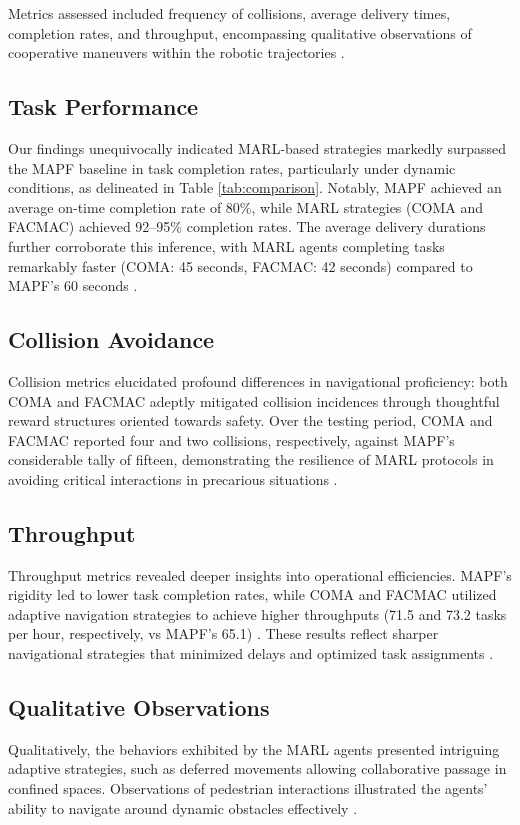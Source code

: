 \documentclass[conference]{IEEEtran}
\begin{document}
Metrics assessed included frequency of collisions, average delivery times, completion rates, and throughput, encompassing qualitative observations of cooperative maneuvers within the robotic trajectories \citep{salinas2023}.

\subsection{Task Performance}
Our findings unequivocally indicated MARL-based strategies markedly surpassed the MAPF baseline in task completion rates, particularly under dynamic conditions, as delineated in Table \ref{tab:comparison}. Notably, MAPF achieved an average on-time completion rate of 80\%, while MARL strategies (COMA and FACMAC) achieved 92--95\% completion rates. The average delivery durations further corroborate this inference, with MARL agents completing tasks remarkably faster (COMA: 45 seconds, FACMAC: 42 seconds) compared to MAPF’s 60 seconds \citep{salinas2023}.

\subsection{Collision Avoidance}
Collision metrics elucidated profound differences in navigational proficiency: both COMA and FACMAC adeptly mitigated collision incidences through thoughtful reward structures oriented towards safety. Over the testing period, COMA and FACMAC reported four and two collisions, respectively, against MAPF’s considerable tally of fifteen, demonstrating the resilience of MARL protocols in avoiding critical interactions in precarious situations \citep{salinas2023}.

\subsection{Throughput}
Throughput metrics revealed deeper insights into operational efficiencies. MAPF’s rigidity led to lower task completion rates, while COMA and FACMAC utilized adaptive navigation strategies to achieve higher throughputs (71.5 and 73.2 tasks per hour, respectively, vs MAPF’s 65.1) \citep{salinas2023}. These results reflect sharper navigational strategies that minimized delays and optimized task assignments \citep{gerkey2023}.

\subsection{Qualitative Observations}
Qualitatively, the behaviors exhibited by the MARL agents presented intriguing adaptive strategies, such as deferred movements allowing collaborative passage in confined spaces. Observations of pedestrian interactions illustrated the agents’ ability to navigate around dynamic obstacles effectively \citep{rostumi2019}.
\end{document}
